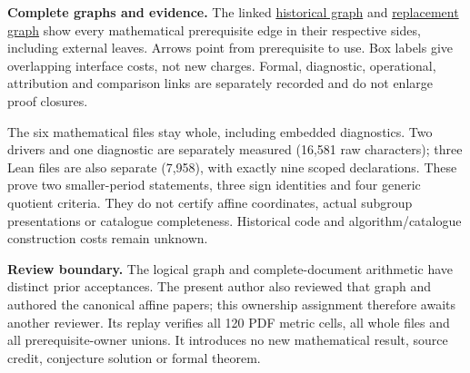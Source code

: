 \documentclass[11pt]{article}
\begin{document}
\textbf{Complete graphs and evidence.}
The linked \href{historical_graph.svg}{historical graph} and
\href{new_graph.svg}{replacement graph} show every mathematical prerequisite
edge in their respective sides, including external leaves. Arrows point from
prerequisite to use. Box labels give overlapping interface costs, not new
charges. Formal, diagnostic, operational, attribution and comparison links
are separately recorded and do not enlarge proof closures.

The six mathematical files stay whole, including embedded diagnostics.
Two drivers and one diagnostic are separately measured (16,581 raw characters);
three Lean files are also separate (7,958), with exactly nine scoped
declarations. These prove two smaller-period statements, three sign identities
and four generic quotient criteria. They do not certify affine coordinates,
actual subgroup presentations or catalogue completeness. Historical code and
algorithm/catalogue construction costs remain unknown.

\textbf{Review boundary.}
The logical graph and complete-document arithmetic have distinct prior
acceptances. The present author also reviewed that graph and authored the
canonical affine papers; this ownership assignment therefore awaits another
reviewer. Its replay verifies all 120 PDF metric cells, all whole files and
all prerequisite-owner unions. It introduces no new mathematical result,
source credit, conjecture solution or formal theorem.
\end{document}
